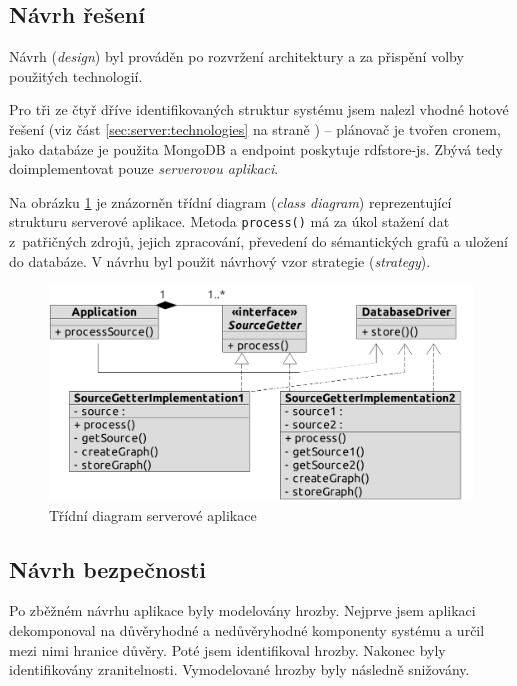 \subsection{Návrh řešení}
Návrh (\textit{design}) byl prováděn po rozvržení architektury a za přispění volby použitých technologií.

Pro tři ze čtyř dříve identifikovaných struktur systému jsem nalezl vhodné hotové řešení (viz část \ref{sec:server:technologies} na straně \pageref{sec:server:technologies}) -- plánovač je tvořen cronem, jako databáze je použita MongoDB a  endpoint poskytuje rdfstore-js. Zbývá tedy doimplementovat pouze \textit{serverovou aplikaci}.

Na obrázku \ref{fig:server:class} je znázorněn třídní diagram (\textit{class diagram}) reprezentující strukturu serverové aplikace. Metoda \texttt{process()} má za úkol stažení dat z~patřičných zdrojů, jejich zpracování, převedení do sémantických grafů a uložení do databáze. V návrhu byl použit návrhový vzor strategie (\textit{strategy}).

\begin{figure}[h]
 \centering
 \includegraphics[width=11.47cm]{./figures/class-s.pdf}
 \caption{Třídní diagram serverové aplikace}
 \label{fig:server:class}
\end{figure}



\subsection{Návrh bezpečnosti}
Po zběžném návrhu aplikace byly modelovány hrozby. Nejprve jsem aplikaci dekomponoval na důvěryhodné a nedůvěryhodné komponenty systému a určil mezi nimi hranice důvěry. Poté jsem identifikoval hrozby. Nakonec byly identifikovány zranitelnosti. Vymodelované hrozby byly následně snižovány.

